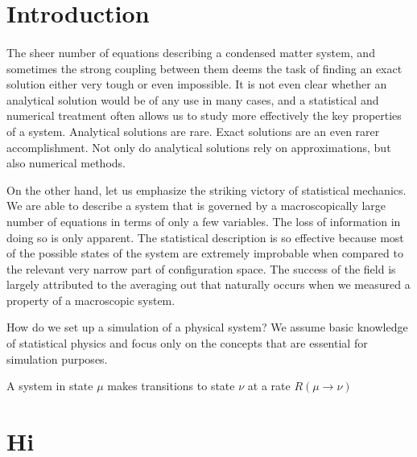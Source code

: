 \documentclass[10pt, twocolumn, twoside]{article}
\begin{document}
\section{Introduction}\paragraph{}
The sheer number of equations describing a condensed matter system, and sometimes the strong coupling between them deems the task of finding an exact solution either very tough or even impossible. It is not even clear whether an analytical solution would be of any use in many cases, and a statistical and numerical treatment often allows us to study more effectively the key properties of a system. Analytical solutions are rare. Exact solutions are an even rarer accomplishment. Not only do analytical solutions rely on approximations, but also numerical methods.

On the other hand, let us emphasize the striking victory of statistical mechanics. We are able to describe a system that is governed by a macroscopically large number of equations in terms of only a few variables. The loss of information in doing so is only apparent. The statistical description is so effective because most of the possible states of the system are extremely improbable when compared to the relevant very narrow part of configuration space. The success of the field is largely attributed to the averaging out that naturally occurs when we measured a property of a macroscopic system.

How do we set up a simulation of a physical system? We assume basic knowledge of statistical physics and focus only on the concepts that are essential for simulation purposes.

A system in state $\mu$ makes transitions to state $\nu$ at a rate $R(\mu \rightarrow \nu)$

\section{Hi}
\end{document}
